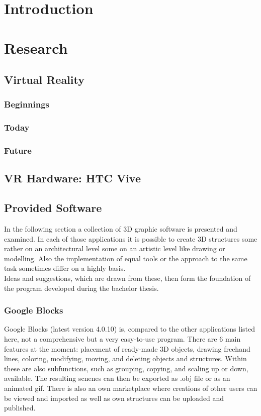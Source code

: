 \documentclass{report}
\begin{document}
\tableofcontents

\chapter{Introduction}

\chapter{Research}

	\section{Virtual Reality}
	\startsection
		\subsection{Beginnings}
		\startsubsection
		\closesection
		\subsection{Today}
		\startsubsection
		\closesection
		\subsection{Future}
		\startsubsection
		\closesection
	\closesection
		
	\section{VR Hardware: HTC Vive}
	\startsection
	\closesection
	
	\section{Provided Software}
	\startsection
		In the following section a collection of 3D graphic software is presented and examined. In each of those applications it is possible to create 3D structures some rather on an architectural level some on an artistic level like drawing or modelling. Also the implementation of equal tools or the approach to the same task sometimes differ on a highly basis. \\
		Ideas and suggestions, which are drawn from these, then form the foundation of the program developed during the bachelor thesis.
		\subsection[Google Blocks]{Google Blocks \textsc{\small{\cite{GB4}}}}
		\startsubsection
			Google Blocks (latest version 4.0.10) is, compared to the other applications listed here, not a comprehensive but a very easy-to-use program. There are 6 main features at the moment: placement of ready-made 3D objects, drawing freehand lines, coloring, modifying, moving, and deleting objects and structures. Within these are also subfunctions, such as grouping, copying, and scaling up or down, available. The resulting scnenes can then be exported as .obj file or as an animated gif. There is also an own marketplace where creations of other users can be viewed and imported as well as own structures can be uploaded and published.
		\closesection
\end{document}
